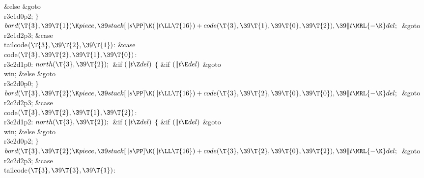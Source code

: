 \2\&{else}\1\5
\&{goto} \\{r3c1d0p2};\5
\2${}\}{}$\2\6
${}\\{bord}(\T{3},\39\T{1})\K\\{piece},\39\\{stack}[\|s\PP]\K(\|t\LL\T{16})+%
\\{code}(\T{3},\39\T{1},\39\T{0},\39\T{2}),\39\|t\MRL{-{\K}}\\{del};{}$\6
\&{goto} \\{r2c1d2p3};\6
\4\&{case} \\{tailcode}${}(\T{3},\39\T{2},\39\T{1}){}$:\5
\&{case} \\{code}${}(\T{3},\39\T{2},\39\T{1},\39\T{0}){}$:\5
\\{r3c2d1p0}:\5
${}\\{north}(\T{3},\39\T{2});{}$\6
\&{if} ${}(\|t\Z\\{del}){}$\5
${}\{{}$\5
\1\&{if} ${}(\|t\E\\{del}){}$\1\5
\&{goto} \\{win};\5
\2\&{else}\1\5
\&{goto} \\{r3c2d0p0};\5
\2${}\}{}$\2\6
${}\\{bord}(\T{3},\39\T{2})\K\\{piece},\39\\{stack}[\|s\PP]\K(\|t\LL\T{16})+%
\\{code}(\T{3},\39\T{2},\39\T{0},\39\T{0}),\39\|t\MRL{-{\K}}\\{del};{}$\6
\&{goto} \\{r2c2d2p3};\6
\4\&{case} \\{code}${}(\T{3},\39\T{2},\39\T{1},\39\T{2}){}$:\5
\\{r3c2d1p2}:\5
${}\\{north}(\T{3},\39\T{2});{}$\6
\&{if} ${}(\|t\Z\\{del}){}$\5
${}\{{}$\5
\1\&{if} ${}(\|t\E\\{del}){}$\1\5
\&{goto} \\{win};\5
\2\&{else}\1\5
\&{goto} \\{r3c2d0p2};\5
\2${}\}{}$\2\6
${}\\{bord}(\T{3},\39\T{2})\K\\{piece},\39\\{stack}[\|s\PP]\K(\|t\LL\T{16})+%
\\{code}(\T{3},\39\T{2},\39\T{0},\39\T{2}),\39\|t\MRL{-{\K}}\\{del};{}$\6
\&{goto} \\{r2c2d2p3};\6
\4\&{case} \\{tailcode}${}(\T{3},\39\T{3},\39\T{1}){}$:\5
